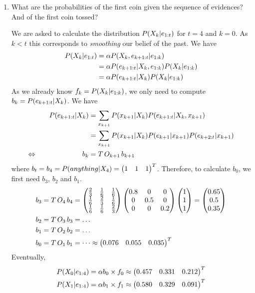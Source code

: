 \documentclass[11pt, a4paper]{article}
\begin{document}
\begin{enumerate}
    \item What are the probabilities of the first coin given the sequence of evidences? And of the first coin tossed?

    \begin{solution}
        We are asked to calculate the distribution $P(X_k \vert e_{1:t})$ for $t = 4$ and $k = 0$. As $k < t$ this corresponds to \emph{smoothing} our belief of the past. We have
        \begin{align*}
            P(X_k \vert e_{1:t}) & = \alpha P(X_k, e_{k + 1:t} \vert e_{1:k}) \\
            & = \alpha P(e_{k + 1:t} \vert X_k, e_{1:k}) P(X_k \vert e_{1:k}) \\
            & = \alpha P(e_{k + 1:t} \vert X_k) P(X_k \vert e_{1:k})
        \end{align*}
        As we already know $f_k = P(X_k \vert e_{1:k})$, we only need to compute $b_k = P(e_{k + 1:t} \vert X_k)$. We have
        \begin{alignat*}{2}
            && P(e_{k + 1:t} \vert X_k) & = \sum_{x_{k + 1}} P(x_{k + 1} \vert X_k) P(e_{k + 1:t} \vert X_k, x_{k + 1}) \\
            &&& = \sum_{x_{k + 1}} P(x_{k + 1} \vert X_k) P(e_{k + 1} \vert x_{k + 1}) P(e_{k + 2:t} \vert x_{k + 1}) \\
            \Leftrightarrow \quad && b_k & = T \, O_{k + 1} \, b_{k + 1}
        \end{alignat*}
        where $b_t = b_4 = P(anything \vert X_4) = \begin{pmatrix}1 & 1 & 1\end{pmatrix}^T$. Therefore, to calculate $b_0$, we first need $b_3$, $b_2$ and $b_1$.
        \begin{align*}
            b_3 & = T \, O_{4} \, b_4 = \begin{pmatrix}
                \frac{2}{3} & \frac{1}{6} & \frac{1}{6} \\
                \frac{1}{6} & \frac{2}{3} & \frac{1}{6} \\
                \frac{1}{6} & \frac{1}{6} & \frac{2}{3}
            \end{pmatrix} \begin{pmatrix}0.8 & 0 & 0 \\ 0 & 0.5 & 0 \\ 0 & 0 & 0.2\end{pmatrix} \begin{pmatrix}1 \\ 1 \\ 1\end{pmatrix} = \begin{pmatrix}0.65 \\ 0.5 \\ 0.35\end{pmatrix} \\
            b_2 & = T \, O_{3} \, b_3 = \dots \\
            b_1 & = T \, O_{2} \, b_2 = \dots \\
            b_0 & = T \, O_{1} \, b_1 = \dots \approx \begin{pmatrix}0.076 & 0.055 & 0.035\end{pmatrix}^T
        \end{align*}
        Eventually,
        \begin{align*}
            P(X_0 \vert e_{1:4}) & = \alpha b_0 \times f_0 \approx \begin{pmatrix}0.457 & 0.331 & 0.212\end{pmatrix}^T \\
            P(X_1 \vert e_{1:4}) & = \alpha b_1 \times f_1 \approx \begin{pmatrix}0.580 & 0.329 & 0.091\end{pmatrix}^T
        \end{align*}
    \end{solution}


\end{enumerate}
\end{document}
